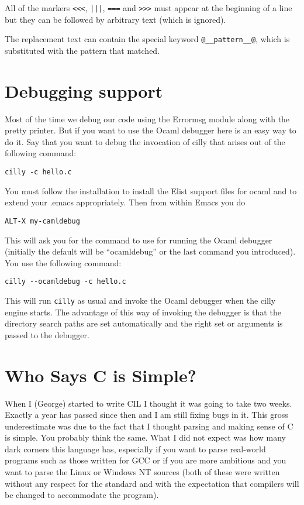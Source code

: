 \documentclass{article}
\def\t#1{{\tt #1}}
\begin{document}
 All of the markers \t{<<<}, \t{|||}, \t{===} and \t{>>>} must appear at the
beginning of a line but they can be followed by arbitrary text (which is
ignored).

 The replacement text can contain the special keyword \t{@\_\_pattern\_\_@},
which is substituted with the pattern that matched. 


\section{Debugging support}\label{sec-debugger}

 Most of the time we debug our code using the Errormsg module along with the
pretty printer. But if you want to use the Ocaml debugger here is an easy way
to do it. Say that you want to debug the invocation of cilly that arises out
of the following command:
\begin{verbatim}
cilly -c hello.c 
\end{verbatim}

 You must follow the installation 
to install the Elist support files for ocaml and to extend your .emacs
appropriately. Then from within Emacs you do
\begin{verbatim}
ALT-X my-camldebug
\end{verbatim}

 This will ask you for the command to use for running the Ocaml debugger
(initially the default will be ``ocamldebug'' or the last command you
introduced). You use the following command:
\begin{verbatim}
cilly --ocamldebug -c hello.c 
\end{verbatim}

 This will run \t{cilly} as usual and invoke the Ocaml debugger when the cilly
engine starts. The advantage of this way of invoking the debugger is that the
directory search paths are set automatically and the right set or arguments is
passed to the debugger. 


\section{Who Says C is Simple?}\label{sec-simplec}

 When I (George) started to write CIL I thought it was going to take two weeks.
Exactly a year has passed since then and I am still fixing bugs in it. This
gross underestimate was due to the fact that I thought parsing and making
sense of C is simple. You probably think the same. What I did not expect was
how many dark corners this language has, especially if you want to parse
real-world programs such as those written for GCC or if you are more ambitious
and you want to parse the Linux or Windows NT sources (both of these were
written without any respect for the standard and with the expectation that
compilers will be changed to accommodate the program). 
\end{document}
